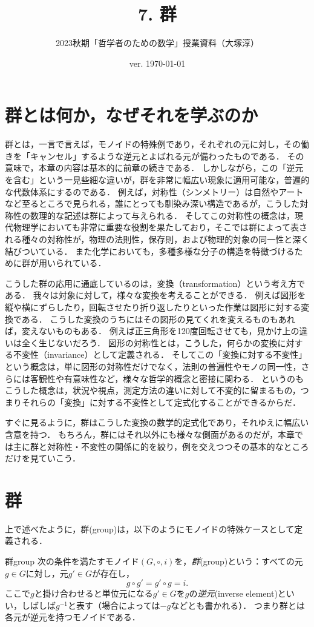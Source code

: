 \documentclass[11pt,a4paper]{jsarticle}
\begin{document}
\title{7. 群}
\author{2023秋期「哲学者のための数学」授業資料（大塚淳）}
\date{ver. \today}
\maketitle

\section{群とは何か，なぜそれを学ぶのか}
群とは，一言で言えば，モノイドの特殊例であり，それぞれの元に対し，その働きを「キャンセル」するような逆元とよばれる元が備わったものである．
その意味で，本章の内容は基本的に前章の続きである．
しかしながら，この「逆元を含む」という一見些細な違いが，群を非常に幅広い現象に適用可能な，普遍的な代数体系にするのである．
例えば，対称性（シンメトリー）は自然やアートなど至るところで見られる，誰にとっても馴染み深い構造であるが，こうした対称性の数理的な記述は群によって与えられる．
そしてこの対称性の概念は，現代物理学においても非常に重要な役割を果たしており，そこでは群によって表される種々の対称性が，物理の法則性，保存則，および物理的対象の同一性と深く結びついている．
また化学においても，多種多様な分子の構造を特徴づけるために群が用いられている．

こうした群の応用に通底しているのは，変換（transformation）という考え方である．
我々は対象に対して，様々な変換を考えることができる．
例えば図形を縦や横にずらしたり，回転させたり折り返したりといった作業は図形に対する変換である．
こうした変換のうちにはその図形の見てくれを変えるものもあれば，変えないものもある．
例えば正三角形を120度回転させても，見かけ上の違いは全く生じないだろう．
図形の対称性とは，こうした，何らかの変換に対する不変性（invariance）として定義される．
そしてこの「変換に対する不変性」という概念は，単に図形の対称性だけでなく，法則の普遍性やモノの同一性，さらには客観性や有意味性など，様々な哲学的概念と密接に関わる．
というのもこうした概念は，状況や視点，測定方法の違いに対して不変的に留まるもの，つまりそれらの「変換」に対する不変性として定式化することができるからだ．

すぐに見るように，群はこうした変換の数学的定式化であり，それゆえに幅広い含意を持つ．
もちろん，群にはそれ以外にも様々な側面があるのだが，本章では主に群と対称性・不変性の関係に的を絞り，例を交えつつその基本的なところだけを見ていこう．


\section{群}
上で述べたように，群(group)は，以下のようにモノイドの特殊ケースとして定義される．
\begin{dfn}{群}{group}
    次の条件を満たすモノイド$(G, \circ, i)$を，\emph{群}(group)という：すべての元$g \in G$に対し，元$g' \in G$が存在し，
    \[ g \circ g' = g' \circ g = i.\]
    ここで$g$と掛け合わせると単位元になる$g' \in G$を$g$の\emph{逆元}(inverse element)といい，しばしば$g^{-1}$と表す（場合によっては$-g$などとも書かれる）．
    つまり群とは各元が逆元を持つモノイドである．
\end{dfn}    
\end{document}

